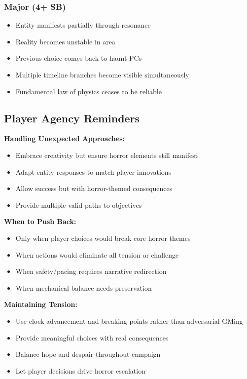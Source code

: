 \documentclass[11pt]{article}
\begin{document}
\subsubsection{Major (4+ SB)}
\begin{itemize}
\item Entity manifests partially through resonance
\item Reality becomes unstable in area
\item Previous choice comes back to haunt PCs
\item Multiple timeline branches become visible simultaneously
\item Fundamental law of physics ceases to be reliable
\end{itemize}

\subsection{Player Agency Reminders}

\textbf{Handling Unexpected Approaches:}
\begin{itemize}
\item Embrace creativity but ensure horror elements still manifest
\item Adapt entity responses to match player innovations
\item Allow success but with horror-themed consequences
\item Provide multiple valid paths to objectives
\end{itemize}

\textbf{When to Push Back:}
\begin{itemize}
\item Only when player choices would break core horror themes
\item When actions would eliminate all tension or challenge
\item When safety/pacing requires narrative redirection
\item When mechanical balance needs preservation
\end{itemize}

\textbf{Maintaining Tension:}
\begin{itemize}
\item Use clock advancement and breaking points rather than adversarial GMing
\item Provide meaningful choices with real consequences
\item Balance hope and despair throughout campaign
\item Let player decisions drive horror escalation
\end{itemize}
\end{document}
